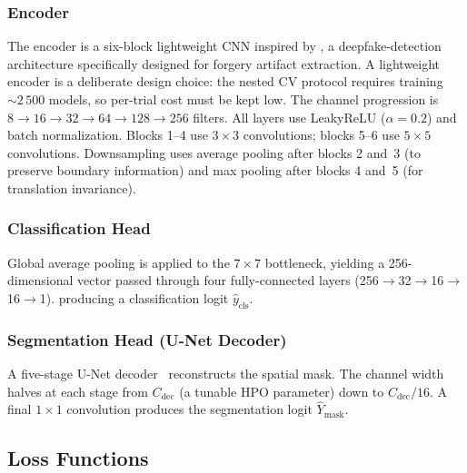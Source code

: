 \subsubsection{Encoder}
The encoder is a six-block lightweight CNN inspired by \citet{patel2023dcnn},
a deepfake-detection architecture specifically designed for forgery artifact
extraction. A lightweight encoder is a deliberate design choice: the nested
CV protocol requires training ${\sim}2\,500$ models, so per-trial cost must
be kept low. The channel progression is $8 \to 16 \to 32 \to 64 \to 128 \to
256$ filters. All layers use LeakyReLU ($\alpha=0.2$)
and batch normalization. Blocks 1--4 use $3 \times 3$
convolutions; blocks 5--6 use $5 \times 5$ convolutions. Downsampling uses
average pooling after blocks 2 and~3 (to preserve boundary information) and
max pooling after blocks 4 and~5 (for translation invariance).

\subsubsection{Classification Head}
Global average pooling is applied to the $7 \times 7$ bottleneck, yielding a
256-dimensional vector passed through four fully-connected layers
(256$\to$32$\to$16$\to$16$\to$1). 
producing a classification logit $\hat{y}_{\text{cls}}$.

\subsubsection{Segmentation Head (U-Net Decoder)}
A five-stage U-Net decoder~\citep{unet2015} reconstructs the spatial mask.
 The
channel width halves at each stage from
$C_{\text{dec}}$ (a tunable HPO parameter) down to $C_{\text{dec}}/16$. A final
$1 \times 1$ convolution produces the segmentation logit $\hat{Y}_{\text{mask}}$.

\subsection{Loss Functions}
\label{subsec:loss}

